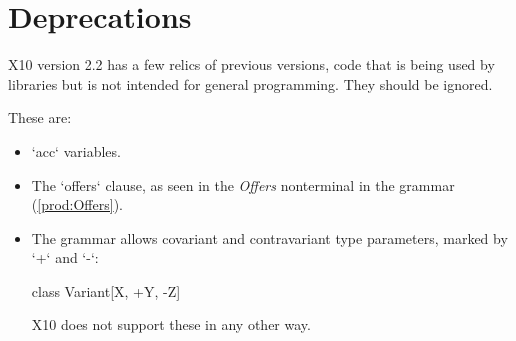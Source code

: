 \chapter{Deprecations}

X10 version 2.2 has a few relics of previous versions, code that is being used
by libraries but is not intended for general programming.    They should be
ignored.

These are: 

\begin{itemize}

\item \xcd`acc` variables. 

\item The \xcd`offers` clause, as seen in the {\it Offers} nonterminal in the
      grammar (\ref{prod:Offers}).

\item The grammar allows covariant and contravariant type parameters, marked
      by \xcd`+` and \xcd`-`: 
\begin{xtenmath}
class Variant[X, +Y, -Z] {}
\end{xtenmath}
      X10 does not support these in any other way.  

\end{itemize}

